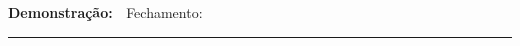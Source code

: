 \documentclass[
	12pt,				%
	oneside,			%
	a4paper,			%
	english,			%
	french,				%
	spanish,			%
	brazil,				%
	]{abntex2}
\newcommand{\C}{\ensuremath {\mathbb{C}} }
\theoremstyle{plain}
\newtheorem{defi}{Definição}[chapter]
\theoremstyle{definition}
\newenvironment{dem}[1][\textbf{Demonstração:} \ ]{\textbf{#1}}{\hfill\rule{2mm}{2mm}}
\begin{document}
\begin{dem}{Fechamento:}
    
\end{dem}




%
%
%
%
%
%
%
%
%
%
%
%
\end{document}
